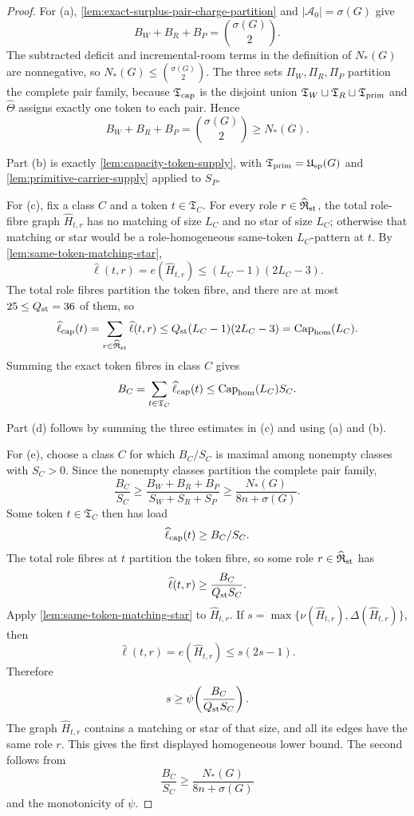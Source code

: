 \documentclass[11pt]{article}
\begin{document}
\begin{proof}
For (a), \cref{lem:exact-surplus-pair-charge-partition} and
\(|\mathcal A_0|=\sigma(G)\) give
\[
B_W+B_R+B_P=\binom{\sigma(G)}2.
\]
The subtracted deficit and incremental-room terms in the definition of
\(N_*(G)\) are nonnegative, so \(N_*(G)\le\binom{\sigma(G)}2\).  The three sets
\(\Pi_W,\Pi_R,\Pi_P\) partition the complete pair family, because
\(\mathfrak T_{\rm cap}\) is the disjoint union
\(\mathfrak T_W\sqcup\mathfrak T_R\sqcup\mathfrak T_{\rm prim}\) and
\(\widehat\Theta\) assigns exactly one token to each pair.  Hence
\[
B_W+B_R+B_P=\binom{\sigma(G)}2\ge N_*(G).
\]

Part (b) is exactly \cref{lem:capacity-token-supply}, with
\(\mathfrak T_{\rm prim}=\mathfrak U_{\rm sp}(G)\) and
\cref{lem:primitive-carrier-supply} applied to \(S_P\).

For (c), fix a class \(C\) and a token \(t\in\mathfrak T_C\).  For every role
\(r\in\widehat{\mathfrak R}_{\rm st}\), the total role-fibre graph
\(\widehat H_{t,r}\) has no matching of size \(L_C\) and no
star of size \(L_C\); otherwise that matching or star would be a
role-homogeneous same-token \(L_C\)-pattern at \(t\).  By
\cref{lem:same-token-matching-star},
\[
\widehat\ell(t,r)=e(\widehat H_{t,r})\le (L_C-1)(2L_C-3).
\]
The total role fibres partition the token fibre, and there are at most
\(25\le Q_{\rm st}=36\) of them, so
\[
\widehat\ell_{\rm cap}(t)
=\sum_{r\in\widehat{\mathfrak R}_{\rm st}}\widehat\ell(t,r)
\le
Q_{\rm st}(L_C-1)(2L_C-3)
=\operatorname{Cap}_{\rm hom}(L_C).
\]
Summing the exact token fibres in class \(C\) gives
\[
B_C
=\sum_{t\in\mathfrak T_C}\widehat\ell_{\rm cap}(t)
\le
\operatorname{Cap}_{\rm hom}(L_C)S_C .
\]

Part (d) follows by summing the three estimates in (c) and using (a) and (b).

For (e), choose a class \(C\) for which \(B_C/S_C\) is maximal among nonempty
classes with \(S_C>0\).  Since the nonempty classes partition the complete
pair family,
\[
\frac{B_C}{S_C}\ge
\frac{B_W+B_R+B_P}{S_W+S_R+S_P}
\ge
\frac{N_*(G)}{8n+\sigma(G)} .
\]
Some token \(t\in\mathfrak T_C\) then has load
\[
\widehat\ell_{\rm cap}(t)\ge B_C/S_C.
\]
The total role fibres at \(t\) partition the token fibre, so some role
\(r\in\widehat{\mathfrak R}_{\rm st}\) has
\[
\widehat\ell(t,r)\ge\frac{B_C}{Q_{\rm st}S_C}.
\]
Apply \cref{lem:same-token-matching-star} to \(\widehat H_{t,r}\).  If
\(s=\max\{\nu(\widehat H_{t,r}),\Delta(\widehat H_{t,r})\}\), then
\[
\widehat\ell(t,r)=e(\widehat H_{t,r})\le s(2s-1).
\]
Therefore
\[
s\ge\psi\!\left(\frac{B_C}{Q_{\rm st}S_C}\right).
\]
The graph \(\widehat H_{t,r}\) contains a matching or star of that size, and all its
edges have the same role \(r\).  This gives the first displayed homogeneous
lower bound.  The second follows from
\[
\frac{B_C}{S_C}\ge \frac{N_*(G)}{8n+\sigma(G)}
\]
and the monotonicity of \(\psi\).
\end{proof}
\end{document}
